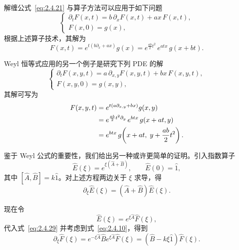 解缠公式~\eqref{eq:2.4.21} 与算子方法可以应用于如下问题
\begin{equation}
\begin{cases}
\partial_{t}F(x,t)=b\,\partial_{x}F(x,t)+a x\,F(x,t),\\[1mm]
F(x,0)=g(x),
\end{cases}
\label{eq:2.4.24}
\end{equation}
根据上述算子技术，其解为
\begin{equation}
F(x,t)=e^{t(b\partial_{x}+a x)}g(x)
=e^{\frac{a b}{2}t^{2}}\,e^{a t x}\,g(x+b t).
\label{eq:2.4.25}
\end{equation}

Weyl 恒等式应用的另一个例子是研究下列 PDE 的解
\begin{equation}
\begin{cases}
\partial_{t}F(x,y,t)=a\,\partial_{x,y}F(x,y,t)+b x\,F(x,y,t),\\[1mm]
F(x,y,0)=g(x,y),
\end{cases}
\label{eq:2.4.26}
\end{equation}
其解可写为
\begin{align}
F(x,y,t)&=e^{t(a\partial_{x,y}+b x)}g(x,y)\notag\\
&=e^{\frac{a b}{2}t^{2}\partial_{y}}\,e^{b t x}\,g(x+a t,y)\notag\\
&=e^{b t x}\,g\!\left(x+a t,\;y+\frac{a b}{2}t^{2}\right).
\label{eq:2.4.27}
\end{align}

鉴于 Weyl 公式的重要性，我们给出另一种或许更简单的证明。引入指数算子
\begin{equation}
\hat{E}(\xi)=e^{\xi(\hat{A}+\hat{B})},\qquad \hat{E}(0)=\hat{1},
\label{eq:2.4.28}
\end{equation}
其中 $[\hat{A},\hat{B}]=k\hat{1}$。对上述方程两边关于 $\xi$ 求导，得
\begin{equation}
\partial_{\xi}\hat{E}(\xi)=(\hat{A}+\hat{B})\hat{E}(\xi).
\label{eq:2.4.29}
\end{equation}

现在令
\begin{equation}
\hat{E}(\xi)=e^{\xi\hat{A}}\hat{F}(\xi),
\label{eq:2.4.30}
\end{equation}
代入式~\eqref{eq:2.4.29} 并考虑到式~\eqref{eq:2.4.10}，得到
\begin{equation}
\partial_{\xi}\hat{F}(\xi)
=e^{-\xi\hat{A}}\hat{B}e^{\xi\hat{A}}\hat{F}(\xi)
=(\hat{B}-k\xi\hat{1})\hat{F}(\xi).
\label{eq:2.4.31}
\end{equation}


